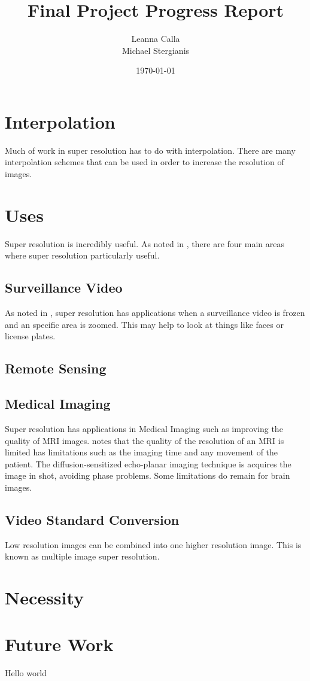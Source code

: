 \documentclass{article}
\title{Final Project Progress Report}
\author{Leanna Calla\\Michael Stergianis}
\date{\today}
\begin{document}
\maketitle
\section{Interpolation}
\label{sec:interpolation}
Much of work in super resolution has to do with interpolation.  There
are many interpolation schemes that can be used in order to increase
the resolution of images.
%
%
\section{Uses}
\label{sec:uses}

Super resolution is incredibly useful. As noted in
\cite{Yang2010ImageSH}, there are four main areas where super
resolution particularly useful.
\subsection{Surveillance Video}
As noted in \cite{Yang2010ImageSH}, super resolution has applications
when a surveillance video is frozen and an specific area is
zoomed. This may help to look at things like faces or license plates.
\subsection{Remote Sensing}

\subsection{Medical Imaging}
Super resolution has applications in Medical Imaging such as improving
the quality of MRI images. \cite{Peled} notes that the quality of the resolution of
an MRI is limited has limitations such as the imaging time and any
movement of the patient. The diffusion-sensitized echo-planar imaging
technique is acquires the image in shot, avoiding phase problems. Some
limitations do remain for brain images.  

\subsection{Video Standard Conversion}
%
Low resolution images can be combined into one higher resolution
image. This is known as multiple image super resolution.
%
%
\section{Necessity}
\label{sec:necessity}
%
%
\section{Future Work}
\label{sec:future}
Hello world
%
\printbibliography
\end{document}
